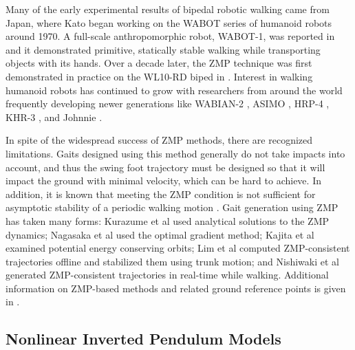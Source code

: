 Many of the early experimental results of bipedal robotic walking came from
Japan, where Kato began working on the WABOT series of humanoid robots around
1970.
%
A full-scale anthropomorphic robot, WABOT-1, was reported in \cite{Kato1974} and
it demonstrated primitive, statically stable walking while transporting objects
with its hands.
%
Over a decade later, the ZMP technique was first demonstrated in practice on the
WL10-RD biped in \cite{Takanishi1985}.
%
Interest in walking humanoid robots has continued to grow with researchers from
around the world frequently developing newer generations like WABIAN-2
\cite{Ogura2006}, ASIMO \cite{Sakagami2002}, HRP-4 \cite{Kaneko2011}, KHR-3
\cite{Park2005}, and Johnnie \cite{Pfeiffer2002}.
%


In spite of the widespread success of ZMP methods, there are recognized
limitations.
%
Gaits designed using this method generally do not take impacts into account, and
thus the swing foot trajectory must be designed so that it will impact the
ground with minimal velocity, which can be hard to achieve.
%
In addition, it is known that meeting the ZMP condition is not sufficient for
asymptotic stability of a periodic walking motion \cite{Choi2005}.
%
Gait generation using ZMP has taken many forms:
%
Kurazume et al \cite{Kurazume2003} used analytical solutions to the ZMP
dynamics;
%
Nagasaka et al \cite{Nagasaka1999} used the optimal gradient method;
%
Kajita et al \cite{Kajita1992} examined potential energy conserving orbits;
%
Lim et al \cite{Lim2002} computed ZMP-consistent trajectories offline and
stabilized them using trunk motion;
%
and Nishiwaki et al \cite{Nishiwaki2002} generated ZMP-consistent trajectories
in real-time while walking.
%
Additional information on ZMP-based methods and related ground reference points
is given in \cite{Goswami1999, Vukobratovic2004, Vukobratovic2006,
  Popovic2005}.

%

\subsection{Nonlinear Inverted Pendulum Models}

